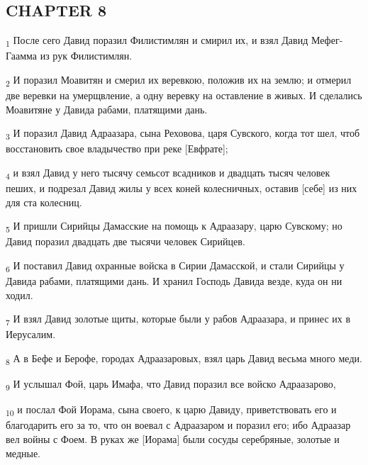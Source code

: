 \subsection{CHAPTER 8}
\begin{tcolorbox}
\textsubscript{1} После сего Давид поразил Филистимлян и смирил их, и взял Давид Мефег-Гаамма из рук Филистимлян.
\end{tcolorbox}
\begin{tcolorbox}
\textsubscript{2} И поразил Моавитян и смерил их веревкою, положив их на землю; и отмерил две веревки на умерщвление, а одну веревку на оставление в живых. И сделались Моавитяне у Давида рабами, платящими дань.
\end{tcolorbox}
\begin{tcolorbox}
\textsubscript{3} И поразил Давид Адраазара, сына Реховова, царя Сувского, когда тот шел, чтоб восстановить свое владычество при реке [Евфрате];
\end{tcolorbox}
\begin{tcolorbox}
\textsubscript{4} и взял Давид у него тысячу семьсот всадников и двадцать тысяч человек пеших, и подрезал Давид жилы у всех коней колесничных, оставив [себе] из них для ста колесниц.
\end{tcolorbox}
\begin{tcolorbox}
\textsubscript{5} И пришли Сирийцы Дамасские на помощь к Адраазару, царю Сувскому; но Давид поразил двадцать две тысячи человек Сирийцев.
\end{tcolorbox}
\begin{tcolorbox}
\textsubscript{6} И поставил Давид охранные войска в Сирии Дамасской, и стали Сирийцы у Давида рабами, платящими дань. И хранил Господь Давида везде, куда он ни ходил.
\end{tcolorbox}
\begin{tcolorbox}
\textsubscript{7} И взял Давид золотые щиты, которые были у рабов Адраазара, и принес их в Иерусалим.
\end{tcolorbox}
\begin{tcolorbox}
\textsubscript{8} А в Бефе и Берофе, городах Адраазаровых, взял царь Давид весьма много меди.
\end{tcolorbox}
\begin{tcolorbox}
\textsubscript{9} И услышал Фой, царь Имафа, что Давид поразил все войско Адраазарово,
\end{tcolorbox}
\begin{tcolorbox}
\textsubscript{10} и послал Фой Иорама, сына своего, к царю Давиду, приветствовать его и благодарить его за то, что он воевал с Адраазаром и поразил его; ибо Адраазар вел войны с Фоем. В руках же [Иорама] были сосуды серебряные, золотые и медные.
\end{tcolorbox}
